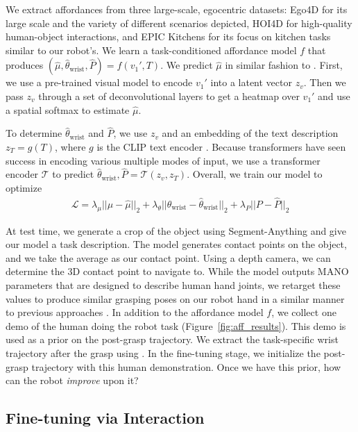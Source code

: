 We extract affordances from three large-scale, egocentric datasets: Ego4D \cite{ego4d} for its large scale and the variety of different scenarios depicted, HOI4D \cite{hoi4d} for high-quality human-object interactions, and EPIC Kitchens \cite{EPICKITCHENS} for its focus on kitchen tasks similar to our robot's. We learn a task-conditioned affordance model $f$ that produces $(\hat{\mu}, \hat{\theta}_\text{wrist}, \hat{P}) = f(v_1', T)$. We predict $\hat{\mu}$ in similar fashion to \cite{bahl2023affordances}. First, we use a pre-trained visual model \cite{r3m} to encode $v_1'$ into a latent vector $z_v$. Then we pass $z_v$ through a set of deconvolutional layers to get a heatmap over $v_1'$ and use a spatial softmax to estimate $\hat{\mu}$.

To determine $\hat{\theta}_\text{wrist}$ and $\hat{P}$, we use $z_v$ and an embedding of the text description $z_T = g(T)$, where $g$ is the CLIP text encoder \cite{Clip}. Because transformers have seen success in encoding various multiple modes of input, we use a transformer encoder $\mathcal{T}$ to predict $\hat{\theta}_\text{wrist}, \hat{P} = \mathcal{T}(z_v, z_T)$. Overall, we train our model to optimize
\begin{align}
    \mathcal{L} = \lambda_\mu || \mu - \hat{\mu} ||_2 + \lambda_\theta || \theta_\text{wrist} - \hat{\theta}_\text{wrist} ||_2 + \lambda_P || P - \hat{P} ||_2
\end{align}


At test time, we generate a crop of the object using Segment-Anything \cite{kirillov2023segment} and give our model a task description. The model generates contact points on the object, and we take the average as our contact point. Using a depth camera, we can determine the 3D contact point to navigate to. While the model outputs MANO parameters \cite{MANO:SIGGRAPHASIA:2017} that are designed to describe human hand joints, we retarget these values to produce similar grasping poses on our robot hand in a similar manner to previous approaches \cite{handa2020dexpilot, sivakumar2022robotic}. In addition to the affordance model $f$, we collect one demo of the human doing the robot task (Figure~\ref{fig:aff_results}). This demo is used as a prior on the post-grasp trajectory.  We extract the task-specific wrist trajectory after the grasp using \cite{FrankMocap_2021_ICCV}. In the fine-tuning stage, we initialize the post-grasp trajectory with this human demonstration. Once we have this prior, how can the robot \textit{improve} upon it? 


\subsection{Fine-tuning via Interaction}

